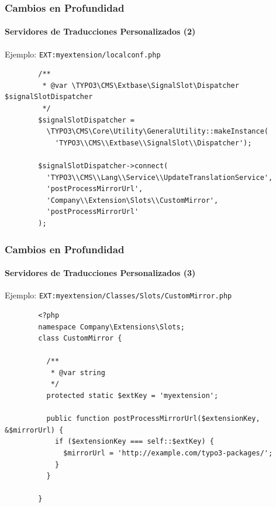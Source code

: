 
\begin{frame}[fragile]
	\frametitle{Cambios en Profundidad}
	\framesubtitle{Servidores de Traducciones Personalizados (2)}

	Ejemplo: \texttt{EXT:myextension/localconf.php}

	\lstset{
		basicstyle=\tiny\ttfamily
	}

	\begin{lstlisting}
		/**
		 * @var \TYPO3\CMS\Extbase\SignalSlot\Dispatcher $signalSlotDispatcher
		 */
		$signalSlotDispatcher =
		  \TYPO3\CMS\Core\Utility\GeneralUtility::makeInstance(
		    'TYPO3\\CMS\\Extbase\\SignalSlot\\Dispatcher');

		$signalSlotDispatcher->connect(
		  'TYPO3\\CMS\\Lang\\Service\\UpdateTranslationService',
		  'postProcessMirrorUrl',
		  'Company\\Extension\Slots\\CustomMirror',
		  'postProcessMirrorUrl'
		);
	\end{lstlisting}

\end{frame}


\begin{frame}[fragile]
	\frametitle{Cambios en Profundidad}
	\framesubtitle{Servidores de Traducciones Personalizados (3)}

	Ejemplo: \texttt{EXT:myextension/Classes/Slots/CustomMirror.php}

	\lstset{
		basicstyle=\tiny\ttfamily
	}

	\begin{lstlisting}
		<?php
		namespace Company\Extensions\Slots;
		class CustomMirror {

		  /**
		   * @var string
		   */
		  protected static $extKey = 'myextension';

		  public function postProcessMirrorUrl($extensionKey, &$mirrorUrl) {
		    if ($extensionKey === self::$extKey) {
		      $mirrorUrl = 'http://example.com/typo3-packages/';
		    }
		  }

		}
	\end{lstlisting}

\end{frame}

